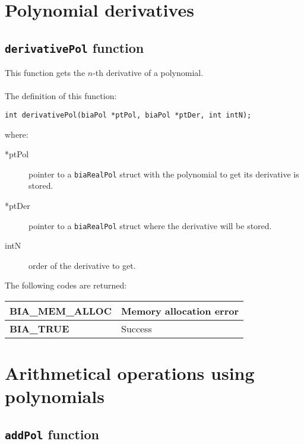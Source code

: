 \section{Polynomial derivatives}

\subsection{\texttt{derivativePol} function}

This function gets the $n$-th derivative of a polynomial.\\ \\
%
The definition of this function:
%
\begin{verbatim}
int derivativePol(biaPol *ptPol, biaPol *ptDer, int intN);
\end{verbatim}
%
where:
\begin{description} 
\item[*ptPol] pointer to a \texttt{biaRealPol} struct with the polynomial to get its derivative is stored.
\item[*ptDer] pointer to a \texttt{biaRealPol} struct where the derivative will be stored.
\item[intN] order of the derivative to get.
\end{description}
%
The following codes are returned:
%
\begin{center}
\begin{tabular}{|l|l|}
\hline
\textbf{BIA\_MEM\_ALLOC} & Memory allocation error \\
\hline
\textbf{BIA\_TRUE} & Success \\
\hline
\end{tabular}
\end{center}
%
%

\section{Arithmetical operations using polynomials}

\subsection{\texttt{addPol} function}

